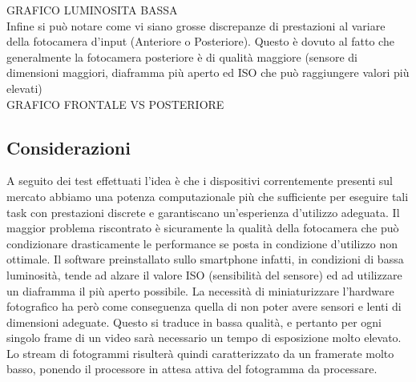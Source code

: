 GRAFICO LUMINOSITA BASSA
\\
Infine si può notare come vi siano grosse discrepanze di prestazioni al variare della fotocamera d'input (Anteriore o Posteriore). Questo è dovuto al fatto che generalmente la fotocamera posteriore è di qualità maggiore (sensore di dimensioni maggiori, diaframma più aperto ed ISO che può raggiungere valori più elevati)
\\
GRAFICO FRONTALE VS POSTERIORE

\subsection{Considerazioni}

A seguito dei test effettuati l'idea è che i dispositivi correntemente presenti sul mercato abbiamo una potenza computazionale più che sufficiente per eseguire tali task con prestazioni discrete e garantiscano un'esperienza d'utilizzo adeguata. Il maggior problema riscontrato è sicuramente la qualità della fotocamera che può condizionare drasticamente le performance se posta in condizione d'utilizzo non ottimale. Il software preinstallato sullo smartphone infatti, in condizioni di bassa luminosità, tende ad alzare il valore ISO (sensibilità del sensore) ed ad utilizzare un diaframma il più aperto possibile. La necessità di miniaturizzare l'hardware fotografico ha però come conseguenza quella di non poter avere sensori e lenti di dimensioni adeguate. Questo si traduce in bassa qualità, e pertanto per ogni singolo frame di un video sarà necessario un tempo di esposizione molto elevato. Lo stream di fotogrammi risulterà quindi caratterizzato da un framerate molto basso, ponendo il processore in attesa attiva del fotogramma da processare. 

